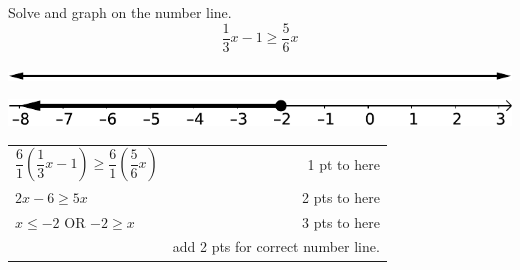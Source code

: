 {
	Solve and graph on the number line. $$\frac{1}{3}x-1 \geq \frac{5}{6}x$$\begin{onlyproblem}\begin{center}\includegraphics{numberLineNoNumbersNoTicks}\end{center}\end{onlyproblem} \begin{onlysolution}\begin{center}\includegraphics{fig095-07-5-d-answer}\end{center}\end{onlysolution}
}
{
	\begin{tabular}{l r}
	$\dfrac{6}{1}\left(\dfrac{1}{3}x-1\right)\geq \dfrac{6}{1}\left(\dfrac{5}{6}x\right)$ & 1 pt to here \\
	$2x-6\geq 5x$ & 2 pts to here \\
	$x\leq -2$ OR $-2\geq x$ & 3 pts to here \\
	 & add 2 pts for correct number line.
	\end{tabular}
}
